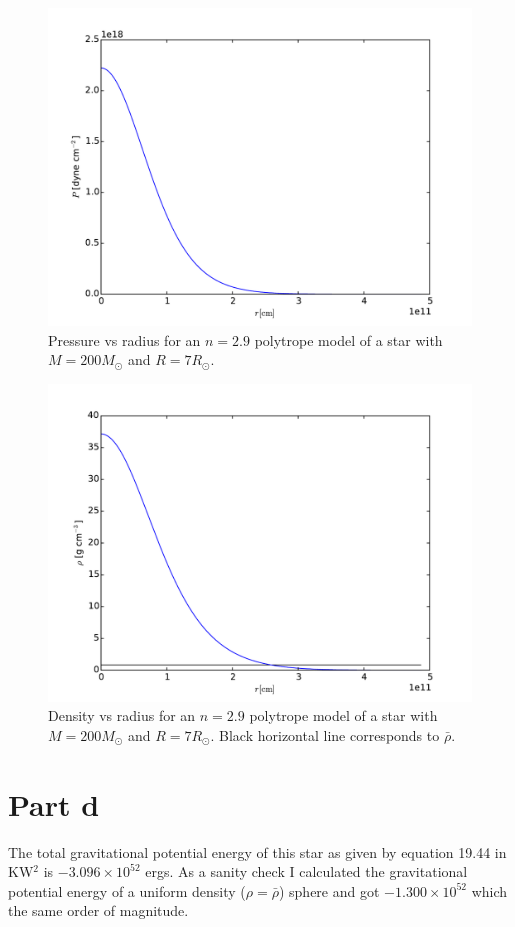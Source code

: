 \documentclass[12pt]{article}
\begin{document}
\begin{figure}[htbp]
\begin{center}
\includegraphics[width=\textwidth]{pressure2p9.pdf}
\caption{Pressure vs radius for an $n=2.9$ polytrope model of a star with $M=200M_\odot$ and $R=7R_\odot$.}
\label{fig:P}
\end{center}
\end{figure}

\begin{figure}[htbp]
\begin{center}
\includegraphics[width=\textwidth,keepaspectratio]{density2p9.pdf}
\caption{Density vs radius for an $n=2.9$ polytrope model of a star with $M=200M_\odot$ and $R=7R_\odot$. Black horizontal line corresponds to $\bar{\rho}$.}
\label{fig:p}
\end{center}
\end{figure}

\section{Part d}
The total gravitational potential energy of this star as given by equation 19.44 in KW$^2$ is $-3.096\times10^{52}$ ergs. As a sanity check I calculated the gravitational potential energy of a uniform density ($\rho=\bar{\rho}$) sphere and got $-1.300\times10^{52}$ which the same order of magnitude.
\end{document}
